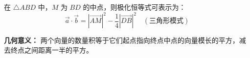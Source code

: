 \begin{statementbox}
在 $\triangle ABD$ 中，$M$ 为 $BD$ 的中点，则极化恒等式可表示为：
\[ \vec{a} \cdot \vec{b} = |\vec{AM}|^2 - \frac{1}{4}|\vec{DB}|^2 \quad (\text{三角形模式}) \]

\textbf{几何意义：}
两个向量的数量积等于它们起点指向终点中点的向量模长的平方，减去终点之间距离一半的平方。
\end{statementbox}